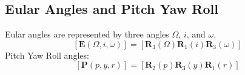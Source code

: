 \subsection{Eular Angles and Pitch Yaw Roll}
Eular angles are represented by three angles $\Omega$, $i$, and $\omega$.
\begin{equation}
    \label{eular_angle}
    \left[\mathbf{E}\left(\Omega,i,\omega\right)\right] =
    \left[\mathbf{R}_3\left(\Omega\right)
          \mathbf{R}_1\left(i\right)
          \mathbf{R}_3\left(\omega\right)\right]
\end{equation}
Pitch Yaw Roll angles:
\begin{equation}
    \label{pitchyawroll_angle_xy}
    \left[\mathbf{P}\left(p,y,r\right)\right] =
    \left[\mathbf{R}_2\left(p\right)
          \mathbf{R}_3\left(y\right)
          \mathbf{R}_1\left(r\right)\right]
\end{equation}

